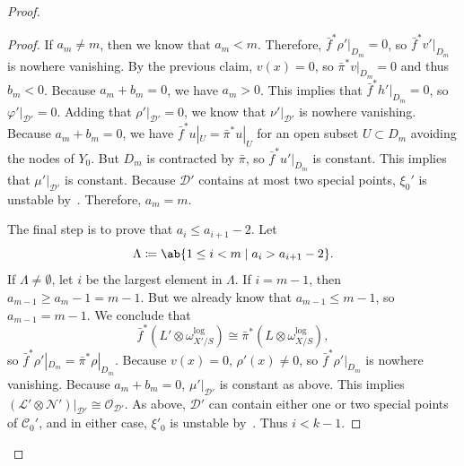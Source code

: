 \documentclass{amsart}
\theoremstyle{definition}
\theoremstyle{remark}
\theoremstyle{plain}
\theoremstyle{definition}
\theoremstyle{remark}
\newcommand{\mc}[1]{\mathcal{#1}}
\newcommand{\1}{\mathbf{1}}
\newcommand{\2}{\mathbf{2}}
\newcommand{\3}{\mathbf{3}}
\begin{document}
\begin{proof}
\begin{proof}
        If $a_m \neq m$, then we know that $a_m < m$. Therefore, $\bar{f}^* \rho'|_{D_m} = 0$, so $\bar{f}^*v'|_{D_m}$ is nowhere vanishing. By the previous claim, $v(x) = 0$, so $\bar{\pi}^* v|_{D_m} = 0$ and thus $b_m < 0$. Because $a_m + b_m = 0$, we have $a_m > 0$. This implies that $\bar{f}^* h'|_{D_m} = 0$, so $\varphi'|_{\mc{D}'} = 0$. Adding that $\rho'|_{\mc{D}'} = 0$, we know that $\nu'|_{\mc{D}'}$ is nowhere vanishing. Because $a_m + b_m = 0$, we have $\bar{f}^* u|_{U} = \bar{\pi}^* u|_{U}$ for an open subset $U \subset D_m$ avoiding the nodes of $Y_0$. But $D_m$ is contracted by $\bar{\pi}$, so $\bar{f}^* u'|_{D_m}$ is constant. This implies that $\mu'|_{\mc{D'}}$ is constant. Because $\mc{D}'$ contains at most two special points, $\xi_0'$ is unstable by~. Therefore, $a_m = m$.

        The final step is to prove that $a_i \leq a_{i+1}-2$. Let 
        \[ \Lambda \coloneqq \ab\{ 1 \leq i < m \mid a_i > a_{i+1}-2\}. \]
        If $\Lambda \neq \emptyset$, let $i$ be the largest element in $\Lambda$. If $i = m-1$, then $a_{m-1} \geq a_m - 1 =  m-1$. But we already know that $a_{m-1} \leq m-1$, so $a_{m-1} = m-1$. We conclude that
        \[ \bar{f}^*(L' \otimes \omega^{\log}_{X'/S}) \cong \bar{\pi}^* (L \otimes \omega^{\log}_{X/S}), \]
        so $\bar{f}^* \rho'|_{D_m} = \bar{\pi}^* \rho|_{D_m}$. Because $v(x) = 0$, $\rho'(x) \neq 0$, so $\bar{f}^* \rho'|_{D_m}$ is nowhere vanishing. Because $a_m + b_m = 0$, $\mu'|_{\mc{D}'}$ is constant as above. This implies $(\mc{L}' \otimes \mc{N}')|_{\mc{D}'} \cong \mc{O}_{\mc{D}'}$. As above, $\mc{D}'$ can contain either one or two special points of $\mc{C}_0'$, and in either case, $\xi'_0$ is unstable by~. Thus $i < k-1$.


\end{proof}
\end{proof}
\end{document}
